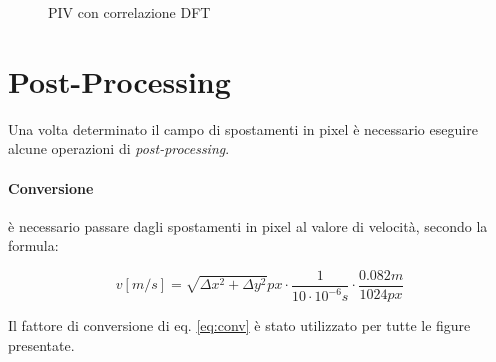 \documentclass[a4paper]{article}
\begin{document}
\begin{figure}[ht]
	\centering
	\caption{PIV con correlazione DFT}
	\label{fig:dft}
\end{figure}


\section{Post-Processing}

Una volta determinato il campo di spostamenti in pixel è necessario eseguire alcune operazioni di \textit{post-processing}.

\paragraph{Conversione} è necessario passare dagli spostamenti in pixel al valore di velocità, secondo la formula:

\begin{equation}
v \left[m/s\right] = \sqrt{\Delta x^2 + \Delta y^2}px \cdot \frac{1}{10\cdot10^{-6}s} \cdot \frac{0.082m}{1024px}
\label{eq:conv}
\end{equation}

Il fattore di conversione di eq. \ref{eq:conv} è stato utilizzato per tutte le figure presentate.
\end{document}
